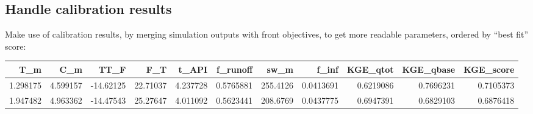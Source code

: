 \documentclass[
]{book}
\newenvironment{Shaded}{\begin{snugshade}}{\end{snugshade}}
\newcommand{\AttributeTok}[1]{\textcolor[rgb]{0.13,0.29,0.53}{#1}}
\newcommand{\CommentTok}[1]{\textcolor[rgb]{0.56,0.35,0.01}{\textit{#1}}}
\newcommand{\ConstantTok}[1]{\textcolor[rgb]{0.56,0.35,0.01}{#1}}
\newcommand{\DecValTok}[1]{\textcolor[rgb]{0.00,0.00,0.81}{#1}}
\newcommand{\FloatTok}[1]{\textcolor[rgb]{0.00,0.00,0.81}{#1}}
\newcommand{\FunctionTok}[1]{\textcolor[rgb]{0.13,0.29,0.53}{\textbf{#1}}}
\newcommand{\NormalTok}[1]{#1}
\newcommand{\OtherTok}[1]{\textcolor[rgb]{0.56,0.35,0.01}{#1}}
\newcommand{\SpecialCharTok}[1]{\textcolor[rgb]{0.81,0.36,0.00}{\textbf{#1}}}
\newcommand{\StringTok}[1]{\textcolor[rgb]{0.31,0.60,0.02}{#1}}
\begin{document}
\hypertarget{handle-calibration-results}{%
\subsection{Handle calibration results}\label{handle-calibration-results}}

Make use of calibration results, by merging simulation outputs with front objectives, to get more readable parameters, ordered by ``best fit'' score:

\begin{Shaded}
\end{Shaded}

\begin{tabular}{r|r|r|r|r|r|r|r|r|r|r}
\hline
T\_m & C\_m & TT\_F & F\_T & t\_API & f\_runoff & sw\_m & f\_inf & KGE\_qtot & KGE\_qbase & KGE\_score\\
\hline
1.298175 & 4.599157 & -14.62125 & 22.71037 & 4.237728 & 0.5765881 & 255.4126 & 0.0413691 & 0.6219086 & 0.7696231 & 0.7105373\\
\hline
1.947482 & 4.963362 & -14.47543 & 25.27647 & 4.011092 & 0.5623441 & 208.6769 & 0.0437775 & 0.6947391 & 0.6829103 & 0.6876418\\
\hline
\end{tabular}
\end{document}
